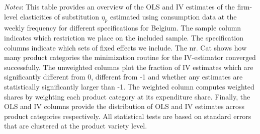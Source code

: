 \begin{landscape}
    \begin{table}[H]
        \centering
        \caption{Weekly Firm-level Elasticities: Dispersion instrument - Belgium}
        \label{tab: app_elas_eta_cats_weekly_q_BE}
        \begin{spacing}{1}
        \end{spacing}
        \parbox{1.2\textwidth}{
        \vspace{10pt}
        \begin{spacing}{1} 
            {\footnotesize 
            \textit{Notes}: This table provides an overview of the OLS and IV estimates of the firm-level elasticities of substitution $\eta_p$ estimated using consumption data at the weekly frequency for different specifications for Belgium. The sample column indicates which restriction we place on the included sample. The specification columns indicate which sets of fixed effects we include. The nr. Cat shows how many product categories the minimization routine for the IV-estimator converged successfully. The unweighted columns plot the fraction of IV estimates which are significantly different from 0, different from -1 and whether any estimates are statistically significantly larger than -1. The weighted column computes weighted shares by weighting each product category at its expenditure share. Finally, the OLS and IV columns provide the distribution of OLS and IV estimates across product categories respectively. All statistical tests are based on standard errors that are clustered at the product variety level.}
            \end{spacing}}
    \end{table}
\end{landscape}

